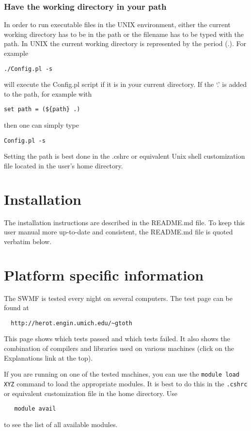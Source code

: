 \subsubsection{Have the working directory in your path}

In order to run executable files in the UNIX environment, either
the current working directory has to be in the path or the filename has
to be typed with the path.
In UNIX the current working directory is represented
by the period (.).  For example
\begin{verbatim} 
./Config.pl -s
\end{verbatim}
will execute the Config.pl script if it is in your current directory.  
If the `.' is added to the path, for example with
\begin{verbatim}
set path = (${path} .)
\end{verbatim}
then one can simply type
\begin{verbatim} 
Config.pl -s
\end{verbatim}
Setting the path is best done in the .cshrc or equivalent Unix shell 
customization file located in the user's home directory.

\section{Installation}

The installation instructions are described in the README.md file.
To keep this user manual more up-to-date and consistent, 
the README.md file is quoted verbatim below.


\section{Platform specific information}

The SWMF is tested every night on several computers.
The test page can be found at
\begin{verbatim}
  http://herot.engin.umich.edu/~gtoth
\end{verbatim}
This page shows which tests passed and which tests failed.
It also shows the combination of compilers and libraries
used on various machines (click on the Explanations link at the top).

If you are running on one of the tested machines, 
you can use the {\tt module load XYZ} command to load 
the appropriate modules. It is best to do this in the {\tt .cshrc} or equivalent 
customization file in the home directory. Use
\begin{verbatim}
   module avail
\end{verbatim}
to see the list of all available modules.


